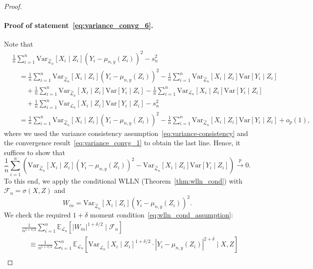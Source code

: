 \documentclass[aos]{imsart}
\theoremstyle{plain}
\theoremstyle{remark}
\newcommand{\E}{\mathbb E}								%
\newcommand{\V}{\mathrm{Var}}							%
\newcommand{\convp}{\overset p \rightarrow}             %
\newcommand{\srx}{X}									%
\newcommand{\srz}{Z}									%
\newcommand{\sry}{Y}									%
\newcommand{\law}{\mathcal L}							%
\newcommand{\lawhat}{\widehat{\mathcal L}}				%
\begin{document}
\begin{proof}
\paragraph*{Proof of statement~\eqref{eq:variance_convg_6}.}

Note that
\begin{equation*}
	\begin{split}
		&\frac{1}{n}\sum_{i = 1}^n \V_{\lawhat_n}[\srx_i\mid\srz_i](\sry_i - \mu_{n,y}(\srz_i))^2-s^2_n \\
		&\quad= \frac{1}{n}\sum_{i = 1}^n \V_{\lawhat_n}[\srx_i\mid\srz_i](\sry_i - \mu_{n,y}(\srz_i))^2 - \frac{1}{n}\sum_{i = 1}^n \V_{\lawhat_n}[\srx_i\mid\srz_i]\V[\sry_i \mid \srz_i]  \\
		&\quad \quad + \frac{1}{n}\sum_{i = 1}^n \V_{\lawhat_n}[\srx_i\mid\srz_i]\V[\sry_i \mid \srz_i] - \frac{1}{n}\sum_{i = 1}^n \V_{\law_n}[\srx_i\mid\srz_i]\V[\sry_i \mid \srz_i] \\
		&\quad \quad + \frac{1}{n}\sum_{i = 1}^n \V_{\law_n}[\srx_i\mid\srz_i]\V[\sry_i \mid \srz_i] - s^2_n \\
		&\quad = \frac{1}{n}\sum_{i = 1}^n \V_{\lawhat_n}[\srx_i\mid\srz_i](\sry_i - \mu_{n,y}(\srz_i))^2 - \frac{1}{n}\sum_{i = 1}^n \V_{\lawhat_n}[\srx_i\mid\srz_i]\V[\sry_i \mid \srz_i] + o_p(1),
	\end{split}
\end{equation*}
where we used the variance consistency assumption~\eqref{eq:variance-consistency} and the convergence result~\eqref{eq:variance_convg_1} to obtain the last line. Hence, it suffices to show that
\begin{equation}
	\frac{1}{n}\sum_{i = 1}^n \left(\V_{\lawhat_n}[\srx_i\mid\srz_i](\sry_i - \mu_{n,y}(\srz_i))^2 - \V_{\lawhat_n}[\srx_i\mid\srz_i]\V[\sry_i \mid \srz_i]\right) \convp 0.
	\label{eq:sufficient-convergence-2}
\end{equation}
To this end, we apply the conditional WLLN (Theorem~\ref{thm:wlln_cond}) with $\mathcal{F}_n = \sigma(X,Z)$ and
	\begin{equation*}
	W_{in} = \V_{\lawhat_n}[\srx_i\mid \srz_i](\sry_i-\mu_{n,y}(\srz_i))^2.
	\end{equation*}
	We check the required $1+\delta$ moment condition~\eqref{eq:wlln_cond_assumption}:
	\begin{align*}
		&\frac{1}{n^{1+\delta/2}} \sum_{i = 1}^n \E_{\law_n}[|W_{in}|^{1+\delta/2} \mid \mathcal{F}_n] \\
		&\quad\equiv \frac{1}{n^{1+\delta/2}} \sum_{i = 1}^n \E_{\law_n}\left[\V_{\lawhat_n}[\srx_i\mid \srz_i]^{1+\delta/2} \cdot |\sry_i-\mu_{n,y}(\srz_i)|^{2+\delta}\mid \srx,\srz\right]\\

\end{align*}
\end{proof}
\end{document}
